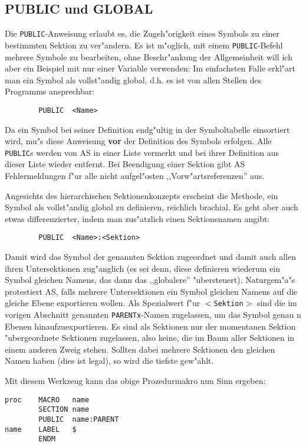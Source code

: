 \documentclass[12pt,a4paper,twoside]{report}
\newcommand{\bb}[1]{{\bf #1}}
\newcommand{\tty}[1]{{\tt #1}}
\begin{document}
\subsection{PUBLIC und GLOBAL}

Die \tty{PUBLIC}-Anweisung erlaubt es, die Zugeh"origkeit eines Symbols
zu einer bestimmten Sektion zu ver"andern.  Es ist m"oglich, mit einem
\tty{PUBLIC}-Befehl mehrere Symbole zu bearbeiten, ohne Beschr"ankung
der Allgemeinheit will ich aber ein Beispiel mit nur einer Variable verwenden:
Im einfachsten Falle erkl"art man ein Symbol als vollst"andig global, d.h.
es ist von allen Stellen des Programms ansprechbar:
\begin{verbatim}
        PUBLIC  <Name>
\end{verbatim}
Da ein Symbol bei seiner Definition endg"ultig in der Symboltabelle
einsortiert wird, mu"s diese Anweisung \bb{vor} der Definition des
Symbols erfolgen.  Alle \tty{PUBLIC}s werden von AS in einer Liste
vermerkt und bei ihrer Definition aus dieser Liste wieder entfernt.  Bei
Beendigung einer Sektion gibt AS Fehlermeldungen f"ur alle nicht
aufgel"osten ,,Vorw"artsreferenzen'' aus.
\par
Angesichts des hierarchischen Sektionenkonzepts erscheint die Methode,
ein Symbol als vollst"andig global zu definieren, reichlich brachial.
Es geht aber auch etwas differenzierter, indem man zus"atzlich einen
Sektionsnamen angibt:
\begin{verbatim}
        PUBLIC  <Name>:<Sektion>
\end{verbatim}
Damit wird das Symbol der genannten Sektion zugeordnet und damit auch
allen ihren Untersektionen zug"anglich (es sei denn, diese definieren
wiederum ein Symbol gleichen Namens, das dann das ,,globalere''
"ubersteuert).  Naturgem"a"s protestiert AS, falls mehrere Untersektionen
ein Symbol gleichen Namens auf die gleiche Ebene exportieren wollen.
Als Spezialwert f"ur \tty{$<$Sektion$>$} sind die im vorigen Abschnitt
genannten \tty{PARENTx}-Namen zugelassen, um das Symbol genau n Ebenen hinaufzuexportieren.
Es sind als Sektionen nur der momentanen Sektion "ubergeordnete Sektionen
zugelassen, also keine, die im Baum aller Sektionen in einem anderen Zweig
stehen.  Sollten dabei mehrere Sektionen den gleichen Namen haben (dies ist
legal), so wird die tiefste gew"ahlt.
\par
Mit diesem Werkzeug kann das obige Prozedurmakro nun Sinn ergeben:
\begin{verbatim}
proc    MACRO   name
        SECTION name
        PUBLIC  name:PARENT
name    LABEL   $
        ENDM
\end{verbatim}
\end{document}
